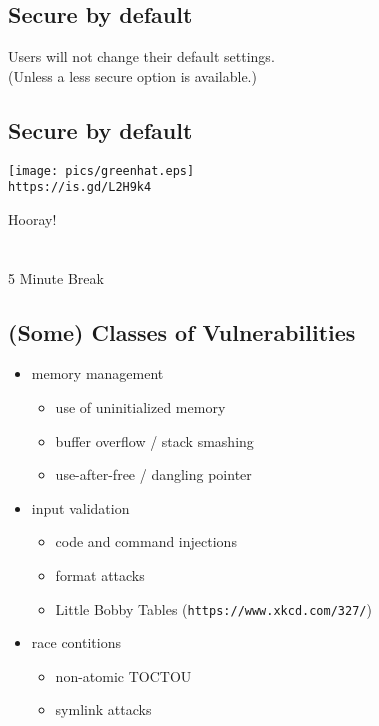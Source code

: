 \documentclass[xga]{xdvislides}
\begin{document}
\subsection{Secure by default}
\vspace{.5in}
\Huge
\begin{center}
Users will not change their default settings. \\
\Normalsize
(Unless a less secure option is available.)
\end{center}

\subsection{Secure by default}
\vspace*{\fill}
\begin{center}
	\texttt{[image: pics/greenhat.eps]} \\
	\vspace{.125in}
	\verb+https://is.gd/L2H9k4+
\end{center}
\vspace*{\fill}

\vspace*{\fill}
\newpage
\vspace*{\fill}
\begin{center}
    \Hugesize
        Hooray! \\ [1em]
    \hspace*{5mm}
    \blueline\\
    \hspace*{5mm}\\
        5 Minute Break
\end{center}
\vspace*{\fill}

\subsection{(Some) Classes of Vulnerabilities}
\Normalsize
\begin{itemize}
	\item memory management
		\begin{itemize}
			\item use of uninitialized memory
			\item buffer overflow / stack smashing
			\item use-after-free / dangling pointer
		\end{itemize}
	\item input validation
		\begin{itemize}
			\item code and command injections
			\item format attacks
			\item Little Bobby Tables ({\tt https://www.xkcd.com/327/})
		\end{itemize}
	\item race contitions
		\begin{itemize}
			\item non-atomic TOCTOU
			\item symlink attacks
		\end{itemize}
\end{itemize}
\end{document}

